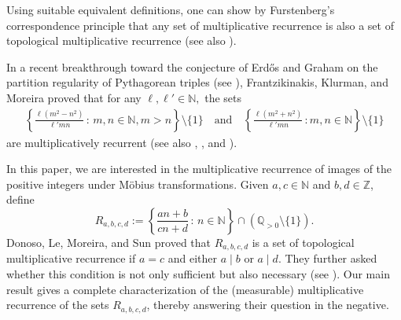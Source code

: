 \documentclass[12pt, reqno, a4paper]{amsart}
\theoremstyle{definition}
\newtheorem{definition}{Definition}[section]
\theoremstyle{remark}
\numberwithin{equation}{section}
\renewcommand{\leq}{\leqslant}
\begin{document}
Using suitable equivalent definitions, one can show by Furstenberg's correspondence principle that any set of multiplicative recurrence is also a set of topological multiplicative recurrence (see also \cite[p. 730]{MR4594405}).


In a recent breakthrough toward the conjecture of Erdős and Graham on the partition regularity of Pythagorean triples (see \cite{MR2337049}), Frantzikinakis, Klurman, and Moreira \cite{frantzikinakis2023partitionregularitypythagoreanpairs} proved that for any $\ell, \ell' \in \mathbb{N},$ the sets 
\begin{align*}
\left\{  \frac{\ell(m^2-n^2)}{\ell'mn} \,:\, m,n \in \mathbb{N}, m>n\right\}\setminus \{1\}\quad \text{and} \quad
\left\{  \frac{\ell(m^2+n^2)}{\ell'mn} \,: m,n \in \mathbb{N} \right\} \setminus \{1\}
\end{align*}
are multiplicatively recurrent (see also \cite{frantzikinakis2024partitionregularitygeneralizedpythagorean}, \cite{frantzikinakis2024partitionregularityhomogeneousquadratics}, and \cite{frantzikinakis2025decompositionresultsmultiplicativeactions}). %





In this paper, we are interested in the multiplicative recurrence of images of the positive integers under Möbius transformations. Given \( a, c \in \mathbb{N} \) and \( b, d \in \mathbb{Z} \), define
\[
R_{a,b,c,d} := \left\{ \frac{an + b}{cn + d} \,:\, n \in \mathbb{N} \right\} \cap (\mathbb{Q}_{>0} \setminus \{1\}).\]
Donoso, Le, Moreira, and Sun \cite[Theorem 1.6]{MR4594405} proved that \( R_{a,b,c,d} \) is a set of topological multiplicative recurrence if $a=c$ and either \( a \mid b \) or \( a \mid d \). They further asked whether this condition is not only sufficient but also necessary (see \cite[Question 7.2]{MR4594405}). Our main result gives a complete characterization of the (measurable) multiplicative recurrence of the sets 
\( R_{a,b,c,d} \), thereby answering their question in the negative.
\end{document}
